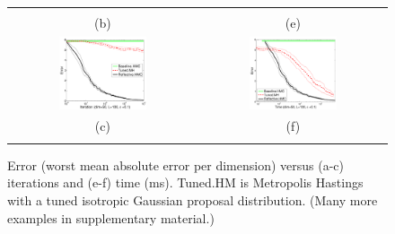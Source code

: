 \documentclass{article} %
\begin{document}
\begin{figure}[t!]
\begin{center}
\begin{tabular}{cc}
\vspace{-1.5mm}
\\
   \hspace{-5mm} \footnotesize(b) 
& \hspace{-4mm} \footnotesize(e) 
\\
\hspace{-5mm} \includegraphics[width=0.49\textwidth,height=0.35\textwidth]{plots1/expectationVsamples_dim50.pdf} 
& \hspace{-3mm} \includegraphics[width=0.49\textwidth,height=0.35\textwidth]{plots1/expectationVtime_dim50.pdf} 
\vspace{-1.5mm}
\\
\hspace{-5mm} \footnotesize(c) 
& \hspace{-4mm} \footnotesize(f) 
\\
\multicolumn{2}{c}{}
\end{tabular}
\end{center}
\vspace{-8mm}
\caption{\footnotesize
Error (worst mean absolute error per dimension) versus (a-c) iterations and (e-f) time (ms). Tuned.HM is Metropolis Hastings with a tuned isotropic Gaussian proposal distribution. (Many more examples in supplementary material.)
} 
\vspace{-10pt}
\end{figure}
\end{document}
